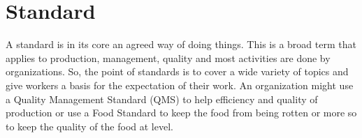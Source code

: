 \section{Standard}
A standard is in its core an agreed way of doing things. This is a broad term that applies to production, management, quality and most activities are done by organizations. So, the point of standards is to cover a wide variety of topics and give workers a basis for the expectation of their work. An organization might use a Quality Management Standard (QMS) to help efficiency and quality of production or use a Food Standard to keep the food from being rotten or more so to keep the quality of the food at level.
